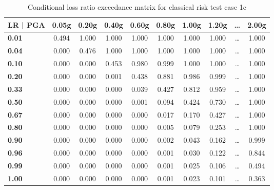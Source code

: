 \begin{table}[htbp]

\centering
\begin{tabular}{ l c c c c c c c c c }

\hline
\rowcolor{anti-flashwhite}
\bf{LR | PGA} & \bf{0.05g} & \bf{0.20g} & \bf{0.40g} & \bf{0.60g} & \bf{0.80g} & \bf{1.00g} & \bf{1.20g} & \bf{\dots} & \bf{2.00g} \\
\hline
\bf{0.01} & 0.494 & 1.000 & 1.000 & 1.000 & 1.000 & 1.000 & 1.000 & \dots & 1.000 \\
\bf{0.04} & 0.000 & 0.476 & 1.000 & 1.000 & 1.000 & 1.000 & 1.000 & \dots & 1.000 \\
\bf{0.10} & 0.000 & 0.000 & 0.453 & 0.980 & 0.999 & 1.000 & 1.000 & \dots & 1.000 \\
\bf{0.20} & 0.000 & 0.000 & 0.001 & 0.438 & 0.881 & 0.986 & 0.999 & \dots & 1.000 \\
\bf{0.33} & 0.000 & 0.000 & 0.000 & 0.039 & 0.427 & 0.812 & 0.959 & \dots & 1.000 \\
\bf{0.50} & 0.000 & 0.000 & 0.000 & 0.001 & 0.094 & 0.424 & 0.730 & \dots & 1.000 \\
\bf{0.67} & 0.000 & 0.000 & 0.000 & 0.000 & 0.017 & 0.170 & 0.427 & \dots & 1.000 \\
\bf{0.80} & 0.000 & 0.000 & 0.000 & 0.000 & 0.005 & 0.079 & 0.253 & \dots & 1.000 \\
\bf{0.90} & 0.000 & 0.000 & 0.000 & 0.000 & 0.002 & 0.043 & 0.162 & \dots & 0.999 \\
\bf{0.96} & 0.000 & 0.000 & 0.000 & 0.000 & 0.001 & 0.030 & 0.122 & \dots & 0.844 \\
\bf{0.99} & 0.000 & 0.000 & 0.000 & 0.000 & 0.001 & 0.025 & 0.106 & \dots & 0.494 \\
\bf{1.00} & 0.000 & 0.000 & 0.000 & 0.000 & 0.001 & 0.023 & 0.101 & \dots & 0.363 \\
\hline
\end{tabular}

\caption{Conditional loss ratio exceedance matrix for classical risk test case 1c}
\label{tab:lrem-ln-tax1-nzcov}
\end{table}